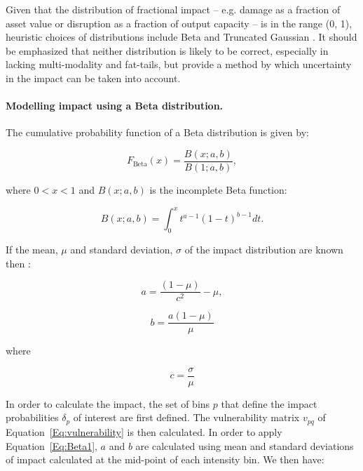 \documentclass[a4paper,11pt]{extarticle} %
\begin{document}
Given that the distribution of fractional impact -- e.g. damage  as a fraction of asset value or disruption as a fraction of output capacity -- is in the range  (0, 1), heuristic choices of distributions include Beta and Truncated Gaussian \cite{MitchellEtAl:2017}. It should be emphasized that neither distribution is likely to be correct, especially in lacking multi-modality and fat-tails, but provide a method by which uncertainty in the impact can be taken into account.

\paragraph{Modelling impact using a Beta distribution.}
The cumulative probability function of a Beta distribution is given by:

\begin{equation}
    \label{Eq:Beta1}
    F_{\text{Beta}}(x) = \frac{B(x; a, b)}{B(1; a, b)} ,
\end{equation}

where $0 < x < 1$ and $B(x; a, b)$ is the incomplete Beta function:

\begin{equation}
    \label{Eq:IncompleteBeta}
    B(x; a, b) = \int_0^{x} t^{a-1} (1 - t)^{b-1} dt .
\end{equation}

If the mean, $\mu$ and standard deviation, $\sigma$ of the impact distribution are known then \cite{MitchellEtAl:2017}:

\begin{equation}
    \label{Eq:BetaA}
    a = \frac{(1 - \mu)}{c^2} - \mu ,
\end{equation}

\begin{equation}
    \label{Eq:BetaB}
    b = \frac{a(1 - \mu)}{\mu}
\end{equation}

where

\begin{equation}
    \label{Eq:BetaC}
    c = \frac{\sigma}{\mu}
\end{equation}

In order to calculate the impact, the set of bins $p$ that define the impact probabilities $\delta_p$ of interest are first defined. The vulnerability matrix $v_{pq}$ of Equation~\ref{Eq:vulnerability} is then calculated. In order to apply Equation~\ref{Eq:Beta1}, $a$ and $b$ are calculated using mean and standard deviations of impact calculated at the mid-point of each intensity bin. We then have:
\end{document}
